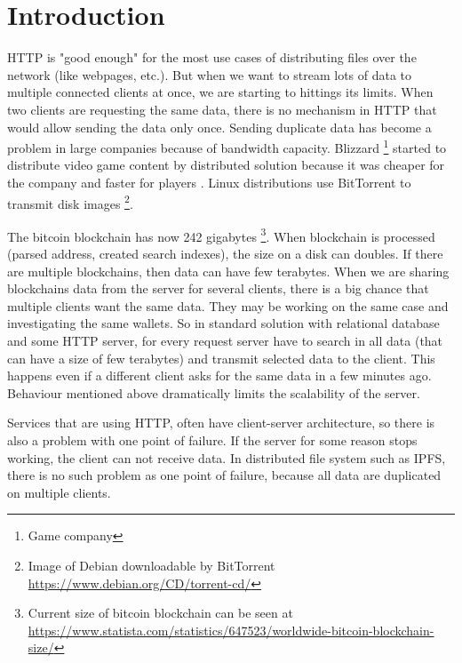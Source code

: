 \chapter{Introduction}


HTTP is "good enough" for the most use cases of distributing files over the network (like webpages, etc.). But when we want to stream lots of data to multiple connected clients at once, we are starting to hittings its limits. When two clients are requesting the same data, there is no mechanism in HTTP that would allow sending the data only once. Sending duplicate data has become a problem in large companies because of bandwidth capacity. Blizzard \footnote{Game company} started to distribute video game content by distributed solution because it was cheaper for the company and faster for players \cite{BigDataInVideoGames}. Linux distributions use BitTorrent to transmit disk images \footnote{Image of Debian downloadable by BitTorrent \url{https://www.debian.org/CD/torrent-cd/}}.

The bitcoin blockchain has now 242 gigabytes \footnote{Current size of bitcoin blockchain can be seen at \url{https://www.statista.com/statistics/647523/worldwide-bitcoin-blockchain-size/}}. When blockchain is processed (parsed address, created search indexes), the size on a disk can doubles. If there are multiple blockchains, then data can have few terabytes. When we are sharing blockchains data from the server for several clients, there is a big chance that multiple clients want the same data. They may be working on the same case and investigating the same wallets.  So in standard solution with relational database and some HTTP server, for every request server have to search in all data (that can have a size of few terabytes) and transmit selected data to the client. This happens even if a different client asks for the same data in a few minutes ago. Behaviour mentioned above dramatically limits the scalability of the server.

Services that are using HTTP, often have client-server architecture, so there is also a problem with one point of failure. If the server for some reason stops working, the client can not receive data. In distributed file system such as IPFS, there is no such problem as one point of failure, because all data are duplicated on multiple clients.